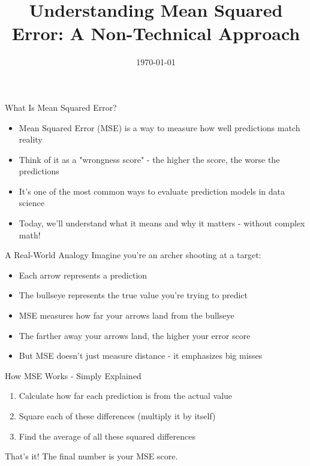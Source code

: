 \documentclass{beamer}
\title{Understanding Mean Squared Error: A Non-Technical Approach}
\author{}
\date{\today}
\begin{document}
\begin{frame}
  \titlepage
\end{frame}

\begin{frame}{What Is Mean Squared Error?}
  \begin{itemize}
    \item Mean Squared Error (MSE) is a way to measure how well predictions match reality
    \item Think of it as a "wrongness score" - the higher the score, the worse the predictions
    \item It's one of the most common ways to evaluate prediction models in data science
    \item Today, we'll understand what it means and why it matters - without complex math!
  \end{itemize}
\end{frame}

\begin{frame}{A Real-World Analogy}
  Imagine you're an archer shooting at a target:
  \begin{itemize}
    \item Each arrow represents a prediction
    \item The bullseye represents the true value you're trying to predict
    \item MSE measures how far your arrows land from the bullseye
    \item The farther away your arrows land, the higher your error score
    \item But MSE doesn't just measure distance - it emphasizes big misses
  \end{itemize}
\end{frame}

\begin{frame}{How MSE Works - Simply Explained}
  \begin{enumerate}
    \item Calculate how far each prediction is from the actual value
    \item Square each of these differences (multiply it by itself)
    \item Find the average of all these squared differences
  \end{enumerate}
  
  \vspace{0.5cm}
  That's it! The final number is your MSE score.
\end{frame}
\end{document}
